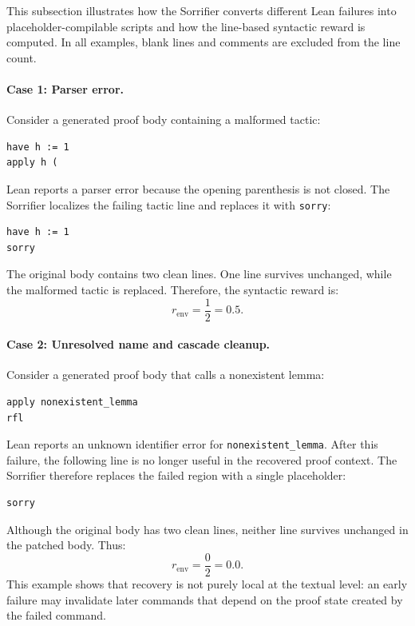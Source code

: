 \documentclass[en]{uet_awesome_thesis/uet-awesome-thesis}
\begin{document}
\begin{appendices}
This subsection illustrates how the Sorrifier converts different Lean failures into
placeholder-compilable scripts and how the line-based syntactic reward is computed. In all examples,
blank lines and comments are excluded from the line count.

\paragraph{Case 1: Parser error.}
Consider a generated proof body containing a malformed tactic:
\begin{verbatim}
have h := 1
apply h (
\end{verbatim}
Lean reports a parser error because the opening parenthesis is not closed. The Sorrifier localizes
the failing tactic line and replaces it with \texttt{sorry}:
\begin{verbatim}
have h := 1
sorry
\end{verbatim}
The original body contains two clean lines. One line survives unchanged, while the malformed tactic is
replaced. Therefore, the syntactic reward is:
\[
r_{\text{env}} = \frac{1}{2} = 0.5.
\]

\paragraph{Case 2: Unresolved name and cascade cleanup.}
Consider a generated proof body that calls a nonexistent lemma:
\begin{verbatim}
apply nonexistent_lemma
rfl
\end{verbatim}
Lean reports an unknown identifier error for \texttt{nonexistent\_lemma}. After this failure, the following
line is no longer useful in the recovered proof context. The Sorrifier therefore replaces the failed
region with a single placeholder:
\begin{verbatim}
sorry
\end{verbatim}
Although the original body has two clean lines, neither line survives unchanged in the patched body.
Thus:
\[
r_{\text{env}} = \frac{0}{2} = 0.0.
\]
This example shows that recovery is not purely local at the textual level: an early failure may invalidate
later commands that depend on the proof state created by the failed command.


\end{appendices}
\end{document}
